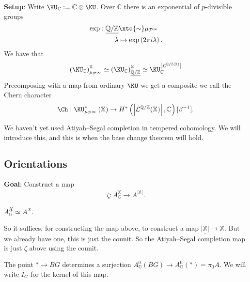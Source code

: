 \textbf{Setup}: Write $\KU_\mathbb{C} := \mathbb{C} \otimes \KU$. Over $\mathbb{C}$ there is an exponential of $p$-divisible groups
\begin{align*}
    \exp : \underline{\mathbb{Q}/\mathbb{Z}} & \xto{\sim} \mu_{\mathcal{P}^\infty} \\
    \lambda &\mapsto \exp \left( 2\pi i \lambda \right).
\end{align*}
We have that
\begin{align*}
    \left( \KU_\mathbb{C} \right)_{\mu_{\mathcal{P}^\infty}}^{\mathbb{X}} \simeq \left( \KU_\mathbb{C} \right)_{\underline{\mathbb{Q}/\mathbb{Z}}}^{\mathbb{X}} \simeq \KU_\mathbb{C}^{\left| \mathcal{L}^{\mathbb{Q}/\mathbb{Z}(\mathbb{X})} \right|}
\end{align*}
Precomposing with a map from ordinary $\KU$ we get a composite we call the Chern character
\begin{align*}
    \Ch: \KU_{\mu_{\mathcal{P}^\infty}}^\ast \left( \mathbb{X} \right) \to H^\ast \left( \left| \mathcal{L}^{\mathbb{Q}/\mathbb{Z}}(\mathbb{X}) \right|, \mathbb{C} \right)[\beta^{-1}].
\end{align*}

We haven't yet used Atiyah--Segal completion in tempered cohomology. We will introduce this, and this is when the base change theorem will hold.

\subsection{Orientations}

\textbf{Goal}: Construct a map
\begin{align*}
    \zeta : A_\mathbb{G}^{\mathbb{X}} \to A^{\left| \mathbb{X} \right|}.
\end{align*}

\begin{fact} $A_\mathbb{G}^{\underline{X}} \simeq A^X$.
\end{fact}

So it suffices, for constructing the map above, to construct a map $\underline{\left| \mathbb{X} \right|} \to \mathbb{X}$. But we already have one, this is just the counit. So the Atiyah--Segal completion map is just $\zeta$ above using the counit.

\begin{note} The point $\ast \to BG$ determines a surjection $A_{\mathbb{G}}^0 (BG) \to A_\mathbb{G}^0(\ast) = \pi_0 A$. We will write $I_G$ for the kernel of this map.
\end{note}

